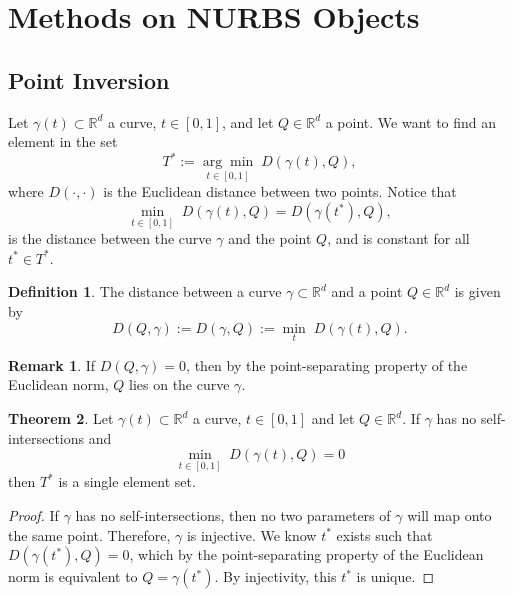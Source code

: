 \documentclass[a4paper, 11pt]{report}
\theoremstyle{definition}
\newtheorem{definition}{Definition}[section]
\newtheorem{theorem}[definition]{Theorem}
\newtheorem*{remark}{Remark}
\begin{document}
\section{Methods on NURBS Objects}
\subsection{Point Inversion}
	Let $\gamma(t) \subset \mathbb{R}^d$ a curve, $t \in [0,1]$, and let $Q \in \mathbb{R}^d$ a point.
	We want to find an element in the set
		$$T^* := \underset{t\in[0,1]}{\arg\min} \; D(\gamma(t), Q), $$
	where $D(\cdot, \cdot)$ is the Euclidean distance between two points. Notice that 
		$$\underset{t\in[0,1]}{\min} \; D(\gamma(t), Q) = D(\gamma(t^*), Q), $$
	is the distance between the curve $\gamma$ and the point $Q$, and is constant for all $t^* \in T^*$.

	\begin{definition}
		The distance between a curve $\gamma \subset \mathbb{R}^d$ and a point $Q \in \mathbb{R}^d$ is given by
			$$D(Q, \gamma) := D(\gamma, Q) := \underset{t}{\min} \; D(\gamma(t), Q).$$
	\end{definition}

	\begin{remark}
		If $D(Q, \gamma) = 0$, then by the point-separating property of the Euclidean norm, $Q$ lies on the curve $\gamma$.
	\end{remark}

	\begin{theorem}
		Let $\gamma(t) \subset \mathbb{R}^d$ a curve, $t \in [0,1]$ and let $Q \in \mathbb{R}^d$. If $\gamma$ has no self-intersections and
			$$\underset{t\in[0,1]}{\min} \; D(\gamma(t), Q) = 0$$
		then $T^*$ is a single element set.
	\end{theorem}
	\begin{proof}
		If $\gamma$ has no self-intersections, then no two parameters of $\gamma$ will map onto the same point. Therefore, $\gamma$ is injective. We know $t^*$ exists such that $D(\gamma(t^*), Q) = 0$, which by the point-separating property of the Euclidean norm is equivalent to $Q = \gamma(t^*)$. By injectivity, this $t^*$ is unique.
	\end{proof}
\end{document}
